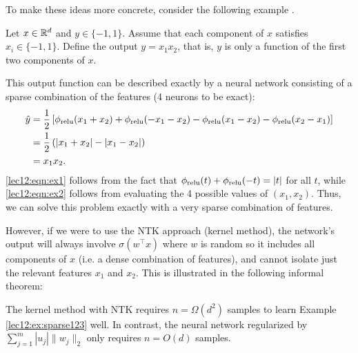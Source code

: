 To make these ideas more concrete, consider the following example \cite{wei2020regularization}. 
\begin{example}\label{lec12:ex:sparse123}
Let $x \in \mathbb R^d$ and $y \in \{-1, 1\}$. Assume that each component of $x$ satisfies $x_i \in \{ -1, 1\}$. Define the output $y = x_1x_2$, that is, $y$ is only a function of the first two components of $x$.

This output function can be described exactly by a neural network consisting of a sparse combination of the features (4 neurons to be exact):
\begin{align}
\hat y &= \frac{1}{2} \left[ \phi_{\textup{relu}}(x_1 + x_2) + \phi_{\textup{relu}}(-x_1 - x_2)  - \phi_{\textup{relu}}(x_1 - x_2) -  \phi_{\textup{relu}}(x_2 - x_1)  \right] \\
&= \frac{1}{2}\left( |x_1 + x_2| - |x_1 - x_2| \right) \label{lec12:eqn:ex1} \\
&= x_1x_2. \label{lec12:eqn:ex2}
\end{align}
\eqref{lec12:eqn:ex1} follows from the fact that $\phi_{\textup{relu}}(t) + \phi_{\textup{relu}}(-t) = |t|$ for all $t$, while \eqref{lec12:eqn:ex2} follows from evaluating the 4 possible values of $(x_1, x_2)$. Thus, we can solve this problem exactly with a very sparse combination of features.

However, if we were to use the NTK approach (kernel method), the network's output will always involve $\sigma(w^\top x)$ where $w$ is random so it includes all components of $x$ (i.e. a dense combination of features), and cannot isolate just the relevant features $x_1$ and $x_2$. This is illustrated in the following informal theorem:
\begin{theorem}
The kernel method with NTK requires $n = \Omega(d^2)$ samples to learn Example \ref{lec12:ex:sparse123} well. In contrast, the neural network regularized by $\sum_{j = 1}^m | u_j| \| w_j\|_2$ only requires $n = O(d)$ samples.
\end{theorem}
\end{example}